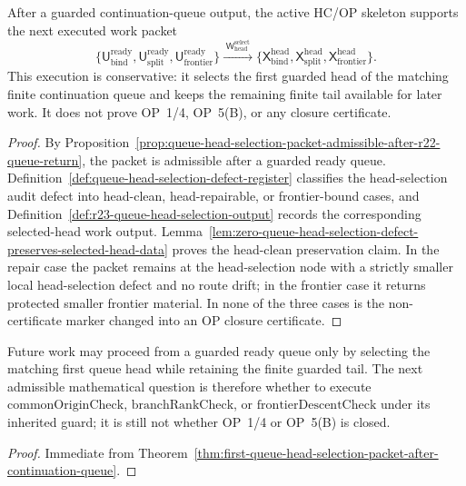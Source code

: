 \begin{theorem}
\label{thm:first-queue-head-selection-packet-after-continuation-queue}
After a guarded continuation-queue output, the active HC/OP skeleton supports the next executed work packet
\[
 \{\mathsf U_{\mathrm{bind}}^{\mathrm{ready}},
 \mathsf U_{\mathrm{split}}^{\mathrm{ready}},
 \mathsf U_{\mathrm{frontier}}^{\mathrm{ready}}\}
 \xrightarrow{\;\mathsf W_{\mathrm{head}}^{\mathrm{select}}\;}
 \{\mathsf X_{\mathrm{bind}}^{\mathrm{head}},
 \mathsf X_{\mathrm{split}}^{\mathrm{head}},
 \mathsf X_{\mathrm{frontier}}^{\mathrm{head}}\}.
\]
This execution is conservative: it selects the first guarded head of the matching finite continuation queue and keeps the remaining finite tail available for later work. It does not prove OP~1/4, OP~5(B), or any closure certificate.
\end{theorem}

\begin{proof}
By Proposition~\ref{prop:queue-head-selection-packet-admissible-after-r22-queue-return}, the packet is admissible after a guarded ready queue. Definition~\ref{def:queue-head-selection-defect-register} classifies the head-selection audit defect into head-clean, head-repairable, or frontier-bound cases, and Definition~\ref{def:r23-queue-head-selection-output} records the corresponding selected-head work output. Lemma~\ref{lem:zero-queue-head-selection-defect-preserves-selected-head-data} proves the head-clean preservation claim. In the repair case the packet remains at the head-selection node with a strictly smaller local head-selection defect and no route drift; in the frontier case it returns protected smaller frontier material. In none of the three cases is the non-certificate marker changed into an OP closure certificate.
\end{proof}

\begin{corollary}
\label{cor:v3340-r23-working-rule}
Future work may proceed from a guarded ready queue only by selecting the matching first queue head while retaining the finite guarded tail. The next admissible mathematical question is therefore whether to execute \(\mathrm{commonOriginCheck}\), \(\mathrm{branchRankCheck}\), or \(\mathrm{frontierDescentCheck}\) under its inherited guard; it is still not whether OP~1/4 or OP~5(B) is closed.
\end{corollary}

\begin{proof}
Immediate from Theorem~\ref{thm:first-queue-head-selection-packet-after-continuation-queue}.
\end{proof}


